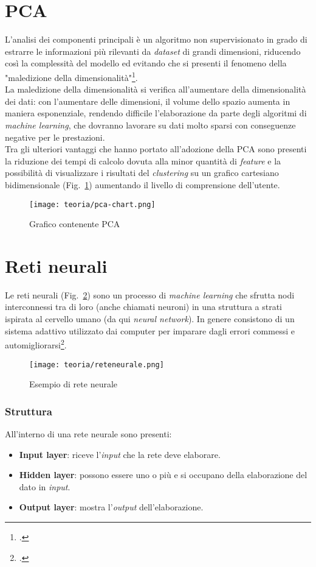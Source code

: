 \section{PCA}
L'analisi dei componenti principali è un algoritmo non supervisionato in grado di estrarre le informazioni più rilevanti da \emph{dataset} di grandi dimensioni, riducendo così la complessità del modello ed evitando che si presenti il fenomeno della "maledizione della dimensionalità"\footcite{site:PCA}.\\La maledizione della dimensionalità si verifica all'aumentare della dimensionalità dei dati: con l'aumentare delle dimensioni, il volume dello spazio aumenta in maniera esponenziale, rendendo difficile l'elaborazione da parte degli algoritmi di \emph{machine learning}, che dovranno lavorare su dati molto sparsi con conseguenze negative per le prestazioni.\\Tra gli ulteriori vantaggi che hanno portato all'adozione della PCA sono presenti la riduzione dei tempi di calcolo dovuta alla minor quantità di \emph{feature} e la possibilità di visualizzare i risultati del \emph{clustering} su un grafico cartesiano bidimensionale (Fig.~\ref{fig:pca-chart}) aumentando il livello di comprensione dell'utente.

\begin{figure}[!h] 
    \centering 
    \texttt{[image: teoria/pca-chart.png]} 
    \caption{Grafico contenente PCA}
    \label{fig:pca-chart}
  \end{figure}

\newpage

\section{Reti neurali}
Le reti neurali (Fig.~\ref{fig:rete-neurale}) sono un processo di \emph{machine learning} che sfrutta nodi interconnessi tra di loro (anche chiamati neuroni) in una struttura a strati ispirata al cervello umano (da qui \emph{neural network}).
In genere consistono di un sistema adattivo utilizzato dai computer per imparare dagli errori commessi e automigliorarsi\footcite{site:rete-neurale}.

\begin{figure}[!h] 
    \centering 
    \texttt{[image: teoria/reteneurale.png]} 
    \caption{Esempio di rete neurale}
    \label{fig:rete-neurale}
  \end{figure}

\subsubsection{Struttura}
All'interno di una rete neurale sono presenti:
\begin{itemize}
    \item \textbf{Input layer}: riceve l'\emph{input} che la rete deve elaborare.
    \item \textbf{Hidden layer}: possono essere uno o più e si occupano della elaborazione del dato in \emph{input}.
    \item \textbf{Output layer}: mostra l'\emph{output} dell'elaborazione.
\end{itemize}

